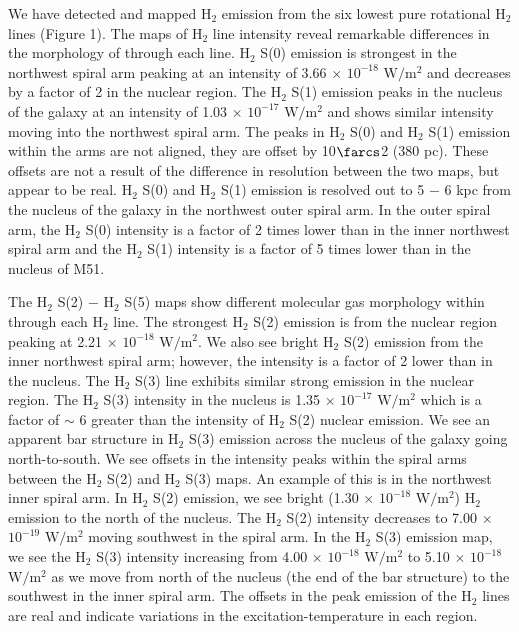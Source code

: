 \documentclass[manuscript]{aastex}
\begin{document}
We have detected and mapped $\mathrm{H_2}$ emission from the six lowest pure rotational $\mathrm{H_2}$ lines (Figure 1).  The maps of $\mathrm{H_2}$ line intensity reveal remarkable differences in the morphology of  through each line.  $\mathrm{H_2}$ S(0) emission is strongest in the northwest spiral arm peaking at an intensity of 3.66 $\times$ $\mathrm{10^{-18}}$ $\mathrm{W/m^2}$ and decreases by a factor of 2 in the nuclear region.  The $\mathrm{H_2}$ S(1) emission peaks in the nucleus of the galaxy at an intensity of 1.03 $\times$ $\mathrm{10^{-17}}$ $\mathrm{W/m^2}$  and shows similar intensity moving into the northwest spiral arm.  The peaks in $\mathrm{H_2}$ S(0) and $\mathrm{H_2}$ S(1) emission within the arms are not aligned, they are offset by 10$\farcs$2 (380 pc).  These offsets are not a result of the difference in resolution between the two maps, but appear to be real. $\mathrm{H_2}$ S(0) and $\mathrm{H_2}$ S(1) emission is resolved out to 5 $-$ 6 kpc from the nucleus of the galaxy in the northwest outer spiral arm.  In the outer spiral arm, the $\mathrm{H_2}$ S(0) intensity 
is a factor of 2 times lower than in the inner northwest spiral arm and the $\mathrm{H_2}$ S(1) intensity is a factor of 5 times lower than in the nucleus of M51.
 
The $\mathrm{ H_2}$ S(2) $-$ $\mathrm{H_2}$ S(5) maps show different  molecular gas morphology within  through each $\mathrm{H_2}$ line.  The strongest $\mathrm{H_2}$ S(2) emission is from the nuclear region peaking at 2.21 $\times$ $\mathrm{10^{-18}}$ $\mathrm{W/m^2}$.  We also see bright $\mathrm{H_2}$ S(2) emission from the inner northwest spiral arm; however, the intensity is a factor of 2 lower than in the nucleus.  The $\mathrm{H_2}$ S(3) line exhibits similar strong emission in the nuclear region.  The $\mathrm{H_2}$ S(3) intensity in the nucleus is 1.35 $\times$ $\mathrm{10^{-17}}$ $\mathrm{W/m^2}$ which is a factor of $\sim$ 6 greater than the intensity of $\mathrm{H_2}$ S(2) nuclear emission.  We see an apparent bar structure in $\mathrm{H_2}$ S(3) emission across the nucleus of the galaxy going north-to-south.  We see offsets in the intensity peaks within the spiral arms between the $\mathrm{H_2}$ S(2) and $\mathrm{H_2}$ S(3) maps.  An example of this is in the northwest inner spiral arm.  In $\mathrm{H_2}$ S(2) emission, we see bright (1.30 $\times$ $\mathrm{10^{-18}}$ $\mathrm{W/m^2}$) $\mathrm{H_2}$ emission to the north of the nucleus.  The $\mathrm{H_2}$ S(2) intensity decreases to 7.00 $\times$ $\mathrm{10^{-19}}$ $\mathrm{W/m^2}$ moving southwest in the spiral arm.  In the $\mathrm{H_2}$ S(3) emission map, we see the $\mathrm{H_2}$ S(3) intensity increasing from 4.00 $\times$ $\mathrm{10^{-18}}$ $\mathrm{W/m^2}$ to 5.10 $\times$ $\mathrm{10^{-18}}$ $\mathrm{W/m^2}$ as we move from north of the nucleus (the end of the bar structure) to the southwest in the inner spiral arm.  The offsets in the peak emission of the $\mathrm{H_2}$ lines are real and indicate variations in the excitation-temperature in each region.
\end{document}
